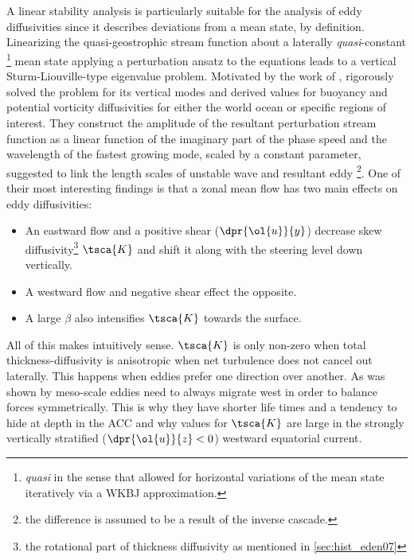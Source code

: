 \section*{\citealt{Eden2011a,eden2012implementing,Vollmer2013a}}\label{sec:hist_eden-linstab}
A linear stability analysis is particularly suitable for the analysis of eddy
diffusivities since it describes deviations from a mean state, by definition.
Linearizing the quasi-geostrophic stream function about a laterally
\textit{quasi}-constant \footnote{\textit{quasi} in the sense that \eg
\citeauthor*{Vollmer2013a} allowed for horizontal variations of the mean state
iteratively via a WKBJ approximation.} mean state \ie applying a perturbation
ansatz to the equations leads to a vertical Sturm-Liouville-type eigenvalue
problem. Motivated by the work of \cite{Smith2007},
\citeauthor{Eden2011a,eden2012implementing,Vollmer2013a} rigorously solved the
problem for its vertical modes and derived values for buoyancy and potential
vorticity diffusivities for either the world ocean or specific regions of
interest.  They construct the amplitude of the resultant perturbation stream
function as a linear function of the imaginary part of the phase speed and the
wavelength of the fastest growing mode, scaled by a
constant parameter, suggested to link the length scales of unstable wave and resultant eddy \footnote{the difference is assumed to be a result of the inverse cascade.}. One of their most interesting findings is that a zonal mean flow has two main effects on eddy diffusivities:
\begin{itemize}
	\item
	An eastward flow and a positive shear ($\dpr{\ol{u}}{y}$) decrease skew diffusivity\footnote{\ie the rotational part of thickness diffusivity as mentioned in \ref{sec:hist_eden07}} $\tsca{K}$  and shift it along with the steering level down vertically.
	\item
	A westward flow and negative shear effect the opposite.
	\item
	A large $\beta$ also intensifies $\tsca{K}$ towards the surface.
\end{itemize}
All of this makes intuitively sense. $\tsca{K}$ is only non-zero when total
thickness-diffusivity is anisotropic \ie when net turbulence does not cancel out
laterally. This happens when eddies prefer one direction over another. As was
shown by \cite{Cushman-Roisin1990} meso-scale eddies need to always migrate west
in order to balance forces symmetrically. This is why they have shorter life
times and a tendency to hide at depth in the ACC and why values for $\tsca{K}$
are large in the strongly vertically stratified ($\dpr{\ol{u}}{z}<0$) westward
equatorial current.




